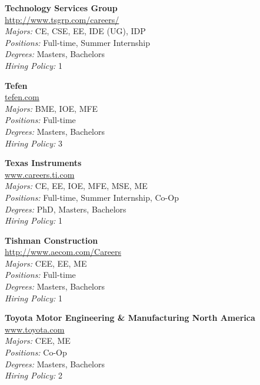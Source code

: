 \documentclass[twoside]{article}
\begin{document}
\begin{center}
\begin{multicols}{3}
\begin{minipage}{.9\columnwidth}{\Large\bf Technology Services Group }\\
	\url{http://www.tsgrp.com/careers/}\\
	\emph{Majors:} CE, CSE, EE, IDE (UG), IDP\\
	\emph{Positions:} Full-time, Summer Internship\\
	\emph{Degrees:} Masters, Bachelors\\
	\emph{Hiring Policy:} 1\\
\end{minipage}
 
\begin{minipage}{.9\columnwidth}{\Large\bf Tefen }\\
	\url{tefen.com}\\
	\emph{Majors:} BME, IOE, MFE\\
	\emph{Positions:} Full-time\\
	\emph{Degrees:} Masters, Bachelors\\
	\emph{Hiring Policy:} 3\\
\end{minipage}
 
\begin{minipage}{.9\columnwidth}{\Large\bf Texas Instruments }\\
	\url{www.careers.ti.com}\\
	\emph{Majors:} CE, EE, IOE, MFE, MSE, ME\\
	\emph{Positions:} Full-time, Summer Internship, Co-Op\\
	\emph{Degrees:} PhD, Masters, Bachelors\\
	\emph{Hiring Policy:} 1\\
\end{minipage}
 
\begin{minipage}{.9\columnwidth}{\Large\bf Tishman Construction }\\
	\url{http://www.aecom.com/Careers}\\
	\emph{Majors:} CEE, EE, ME\\
	\emph{Positions:} Full-time\\
	\emph{Degrees:} Masters, Bachelors\\
	\emph{Hiring Policy:} 1\\
\end{minipage}
 
\begin{minipage}{.9\columnwidth}{\Large\bf Toyota Motor Engineering \& Manufacturing North America }\\
	\url{www.toyota.com}\\
	\emph{Majors:} CEE, ME\\
	\emph{Positions:} Co-Op\\
	\emph{Degrees:} Masters, Bachelors\\
	\emph{Hiring Policy:} 2\\
\end{minipage}
 

\end{multicols}
\end{center}
\end{document}
